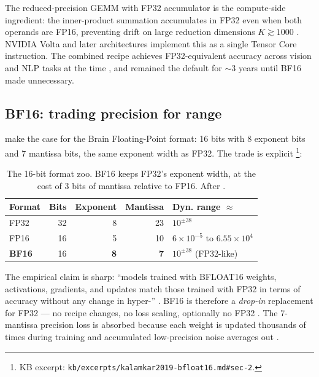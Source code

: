 The reduced-precision GEMM with FP32 accumulator is the compute-side
ingredient: the inner-product summation accumulates in FP32 even when
both operands are FP16, preventing drift on large reduction dimensions
$K \gtrsim 1000$ \citep[\S 4]{micikevicius2017-mixed-precision}. NVIDIA
Volta and later architectures implement this as a single Tensor Core
instruction. The combined recipe achieves FP32-equivalent accuracy
across vision and NLP tasks at the time
\citep[\S 5]{micikevicius2017-mixed-precision}, and remained the
default for $\sim$3 years until BF16 made  unnecessary.

\subsection{BF16: trading precision for range}
\label{sec:mp-bf16}

\citet{kalamkar2019-bfloat16} make the case for the Brain
Floating-Point format: 16 bits with 8 exponent bits and 7 mantissa
bits, the same exponent width as FP32. The trade is explicit
\citep[\S 2]{kalamkar2019-bfloat16}\footnote{KB excerpt:
\nolinkurl{kb/excerpts/kalamkar2019-bfloat16.md#sec-2}.}:

\begin{table}[h]
\centering
\small
\begin{tabular}{lrrrl}
\toprule
Format & Bits & Exponent & Mantissa & Dyn. range $\approx$ \\
\midrule
FP32 & 32 & 8  & 23 & $10^{\pm 38}$ \\
FP16 & 16 & 5  & 10 & $6\times 10^{-5}$ to $6.55\times 10^{4}$ \\
\textbf{BF16} & 16 & \textbf{8} & \textbf{7} & $10^{\pm 38}$ (FP32-like) \\
\bottomrule
\end{tabular}
\caption{The 16-bit format zoo. BF16 keeps FP32's exponent width, at
the cost of 3 bits of mantissa relative to FP16. After
\citet[\S 2]{kalamkar2019-bfloat16}.}
\label{tab:fp16-bf16-fp32}
\end{table}

The empirical claim is sharp: ``models trained with BFLOAT16 weights,
activations, gradients, and updates match those trained with FP32 in
terms of accuracy without any change in hyper-''
\citep[\S 4]{kalamkar2019-bfloat16}. BF16 is therefore a
\emph{drop-in} replacement for FP32 — no recipe changes, no loss
scaling, optionally no FP32 . The 7-mantissa precision
loss is absorbed because each weight is updated thousands of times
during training and accumulated low-precision noise averages out
\citep[\S 3]{kalamkar2019-bfloat16}.

